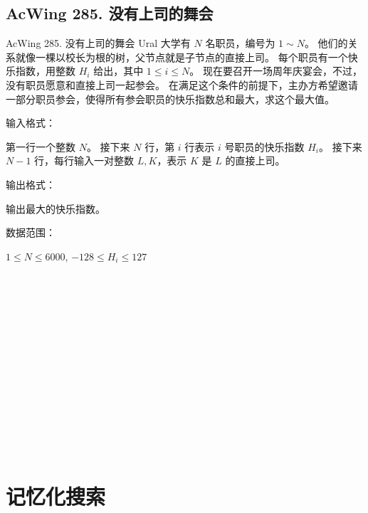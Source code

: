 \subsection{AcWing 285. 没有上司的舞会}
\begin{titledbox}{AcWing 285. 没有上司的舞会}
    Ural 大学有 $N$ 名职员，编号为 $1 \sim N$。 他们的关系就像一棵以校长为根的树，父节点就是子节点的直接上司。 每个职员有一个快乐指数，用整数 $H_i$ 给出，其中 $1 \le i \le N$。 现在要召开一场周年庆宴会，不过，没有职员愿意和直接上司一起参会。 在满足这个条件的前提下，主办方希望邀请一部分职员参会，使得所有参会职员的快乐指数总和最大，求这个最大值。

    输入格式：

    第一行一个整数 $N$。 接下来 $N$ 行，第 $i$ 行表示 $i$ 号职员的快乐指数 $H_i$。 接下来 $N-1$ 行，每行输入一对整数 $L, K$，表示 $K$ 是 $L$ 的直接上司。

    输出格式：

    输出最大的快乐指数。

    数据范围：

    $1 \le N \le 6000$, $-128 \le H_i \le 127$

    \begin{inputblock}
         \\
         \\
         \\
         \\
         \\
         \\
         \\
         \\
         \\
         \\
         \\
         \\
         \\
    \end{inputblock}
    \begin{outputblock}
    \end{outputblock}
\end{titledbox}


\section{记忆化搜索}

